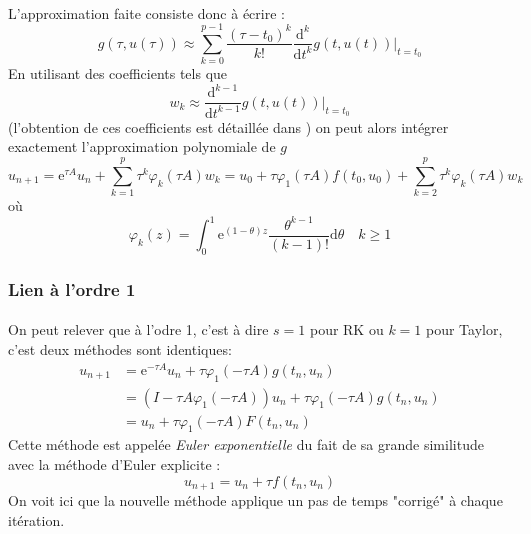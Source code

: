         \paragraph{}
        L'approximation faite consiste donc à écrire :
        \begin{equation} 
            g(\tau, u(\tau)) \approx \sum_{k=0}^{p-1} \frac{\left(\tau-t_{0}\right)^{k}}{k !} \frac{\mathrm{d}^{k}}{\mathrm{d} t^{k}} g\left.(t, u(t))\right|_{t=t_{0}}
        \end{equation}
        En utilisant des coefficients tels que
        \begin{equation}
            w_{k} \approx \frac{\mathrm{d}^{k-1}}{\mathrm{d} t^{k-1}} g\left.(t, u(t))\right|_{t=t_{0}}
        \end{equation}
        (l'obtention de ces coefficients est détaillée dans \cite{Taylor}) on peut alors intégrer exactement l'approximation polynomiale de $g$
        \begin{equation} 
            u_{n+1}=\mathrm{e}^{\tau A} u_{n}+\sum_{k=1}^{p} \tau^{k} \varphi_{k}(\tau A) w_{k} = u_{0}+\tau \varphi_{1}(\tau A) f\left(t_{0}, u_{0}\right)+\sum_{k=2}^{p} \tau^{k} \varphi_{k}(\tau A) w_{k}
        \end{equation}
        où
        \begin{equation} 
            \varphi_{k}(z)=\int_{0}^{1} \mathrm{e}^{(1-\theta) z} \frac{\theta^{k-1}}{(k-1) !} \mathrm{d} \theta \quad k \geq 1
        \end{equation}

    \subsubsection{Lien à l'ordre 1}
        \paragraph{}
        On peut relever que à l'odre 1, c'est à dire $s=1$ pour RK ou $k=1$ pour Taylor, c'est deux méthodes sont identiques:
        \begin{equation}\begin{aligned}
            u_{n+1} &=\mathrm{e}^{-\tau A} u_{n}+\tau \varphi_{1}(-\tau A) g\left(t_{n}, u_{n}\right) \\ &=\left(I-\tau A \varphi_{1}(-\tau A)\right) u_{n}+\tau \varphi_{1}(-\tau A) g\left(t_{n}, u_{n}\right) \\ &=u_{n}+\tau \varphi_{1}(-\tau A) F\left(t_{n}, u_{n}\right)
        \end{aligned}\end{equation}
        Cette méthode est appelée \emph{Euler exponentielle} du fait de sa grande similitude avec la méthode d'Euler explicite :
        $$u_{n+1} = u_n + \tau f(t_n,u_n)$$
        On voit ici que la nouvelle méthode applique un pas de temps "corrigé" à chaque itération.

